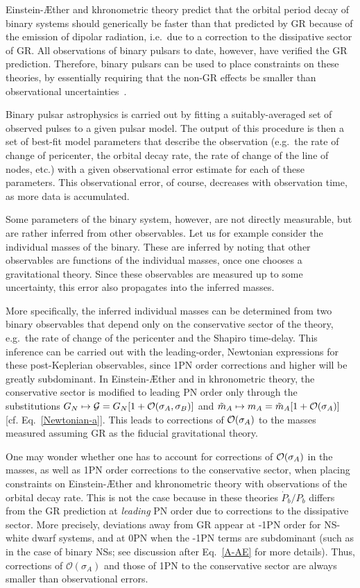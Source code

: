 \documentclass[prd,aps,twocolumn,nofootinbib,showpacs,superscriptaddress]{revtex4-1}
\begin{document}
Einstein-\AE ther and khronometric theory predict that the orbital period decay of binary systems should generically be faster than that predicted by GR because of the emission of dipolar radiation, i.e.~due to a correction to the dissipative sector of GR. All observations of binary pulsars to date, however, have verified the GR prediction. Therefore, binary pulsars can be used to place constraints on these theories, by essentially requiring that the non-GR effects be smaller than observational uncertainties~\cite{stairs}. 

Binary pulsar astrophysics is carried out by fitting a suitably-averaged set of observed pulses to a given pulsar model. The output of this procedure is then a set of best-fit model parameters that describe the observation (e.g.~the rate of change of pericenter, the orbital decay rate, the rate of change of the line of nodes, etc.) with a given observational error estimate for each of these parameters. This observational error, of course, decreases with observation time, as more data is accumulated.   

Some parameters of the binary system, however, are not directly measurable, but are rather inferred from other observables. Let us for example consider the individual masses of the binary. These are inferred by noting that other observables are functions of the individual masses, once one chooses a gravitational theory. Since these observables are measured up to some uncertainty, this error also propagates into the inferred masses.

More specifically, the inferred individual masses can be determined from two binary observables that depend only on the conservative sector of the theory, e.g.~the rate of change of the pericenter and the Shapiro time-delay. This inference can be carried out with the leading-order, Newtonian expressions for these post-Keplerian observables, since 1PN order corrections and higher will be greatly subdominant. In Einstein-\AE ther and in khronometric theory, the conservative sector is modified to leading PN order only through the substitutions $G_{N} \mapsto {\cal{G}}=G_{N}[1+{\cal{O}}(\sigma_{A},\sigma_{B})]$ and $\tilde{m}_{A} \mapsto m_{A}=\tilde{m}_{A} [1+{\cal{O}}(\sigma_{A})]$ [cf. Eq.~\eqref{Newtonian-a}]. This leads to corrections of ${\cal{O}}(\sigma_{A})$ to the masses measured assuming GR as the fiducial gravitational theory. 

One may wonder whether one has to account for corrections of ${\cal{O}}(\sigma_{A})$ in the masses, as well as 1PN order corrections to the conservative sector, when placing constraints on Einstein-\AE ther and khronometric theory with observations of the orbital decay rate. This is not the case  because in these theories $\dot{P}_b /P_b$ differs from
the GR prediction at \textit{leading} PN order due to corrections to
the dissipative sector.
More precisely, deviations away from GR appear at -1PN order for NS-white dwarf
systems, and at 0PN when the -1PN terms are subdominant (such as in the case of
binary NSs; see discussion after Eq.~\eqref{A-AE} for more details).
Thus, corrections of $\mathcal{O}(\sigma_A)$ and those of 1PN to the conservative
sector are always smaller than observational errors.  
\end{document}

